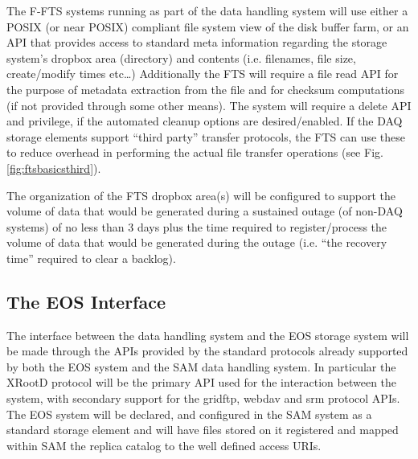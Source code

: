 \documentclass[12pt]{article}
\begin{document}
The F-FTS systems running as part of the data handling system will use either a POSIX (or near POSIX) compliant file system view of the disk buffer farm,
or an API that provides access to standard meta information regarding the storage system’s dropbox area (directory) and contents
(i.e. filenames, file size, create/modify times etc…)  Additionally the FTS will require a file read API for the purpose of metadata
extraction from the file and for checksum computations (if not provided through some other means).  The system will require a
delete API and privilege, if the automated cleanup options are desired/enabled.  If the DAQ storage elements support ``third party''
transfer protocols, the FTS can use these to reduce overhead in performing the actual file transfer operations  (see Fig. \ref{fig:ftsbasicsthird}).

The organization of the FTS dropbox area(s) will be configured to support the volume of data that would be generated during a
sustained outage (of non-DAQ systems) of no less than 3 days plus the time required to register/process the volume of data
that would be generated during the outage (i.e. ``the recovery time'' required to clear a backlog).

\subsection{The EOS Interface}
The interface between the data handling system and the EOS storage system will be made through the APIs
provided by the standard protocols already supported by both the EOS system and the SAM data handling system.
In particular the XRootD protocol will be the primary API used for the interaction between the system, with secondary
support for the gridftp, webdav and srm protocol APIs.  The EOS system will be declared, and configured in the SAM
system as a standard storage element and will have files stored on it registered and mapped within SAM the replica
catalog to the well defined access URIs. 
\end{document}
